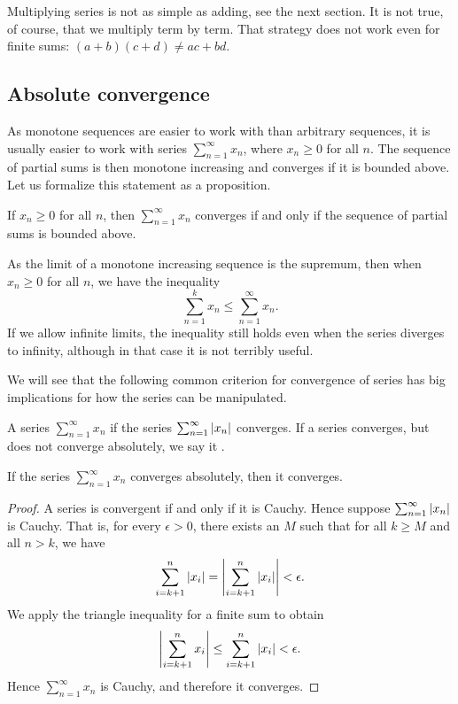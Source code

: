 Multiplying series is not as simple as adding, see the next
section.
It is not true, of course, that we multiply
term by term.  That strategy does not work even for finite sums:
$(a+b)(c+d) \not= ac+bd$.

\subsection{Absolute convergence}

As monotone sequences are easier to work with than arbitrary sequences, it
is usually easier to work with series $\sum_{n=1}^\infty x_n$, where $x_n \geq 0$ for
all $n$.  The sequence of partial sums is then monotone increasing
and converges if it is bounded above.
Let us formalize this statement as a proposition.

\begin{prop}
If $x_n \geq 0$ for all $n$, then $\sum_{n=1}^\infty x_n$ converges if and only if
the sequence of partial sums is bounded above.
\end{prop}

As the limit of a monotone increasing sequence is the supremum, then
when $x_n \geq 0$ for all $n$, we have the
inequality
\begin{equation*}
\sum_{n=1}^k x_n \leq
\sum_{n=1}^\infty x_n .
\end{equation*}
If we allow infinite limits, the inequality still
holds even when the series diverges to infinity, although in that case it is not
terribly useful.

We will see that the following common criterion for convergence of series 
has big implications for how the series can be manipulated.

\begin{defn}
A series $\sum_{n=1}^\infty x_n$
\emph{} if
the series $\sum_{n=1}^\infty \left\lvert {x_n} \right\rvert$ converges.
If a series converges, but does not converge absolutely, we say
it \emph{}.
\end{defn}

\begin{prop}
If the series $\sum_{n=1}^\infty x_n$ converges absolutely, then it converges.
\end{prop}

\begin{proof}
A series is convergent if and only if it is Cauchy.  Hence
suppose $\sum_{n=1}^\infty \left\lvert {x_n} \right\rvert$ is Cauchy.  That is, for every $\epsilon > 0$,
there exists an $M$ such that for all $k \geq M$ and all $n > k$, we have 
\begin{equation*}
\sum_{i=k+1}^n \left\lvert {x_i} \right\rvert 
=
\left\lvert { \sum_{i=k+1}^n \left\lvert {x_i} \right\rvert } \right\rvert
<
\epsilon .
\end{equation*}
We apply the triangle inequality for a finite sum to obtain
\begin{equation*}
\left\lvert { \sum_{i=k+1}^n x_i } \right\rvert
\leq
\sum_{i=k+1}^n \left\lvert {x_i} \right\rvert
<
\epsilon .
\end{equation*}
Hence $\sum_{n=1}^\infty x_n$ is Cauchy, and therefore it converges.
\end{proof}

